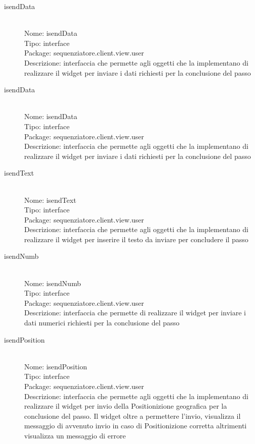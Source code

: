 \begin{description}
	\item[isendData] 
  	\hfill \\
  	Nome: isendData\\
  	Tipo: interface\\
	Package: sequenziatore.client.view.user\\
	Descrizione: interfaccia che permette agli oggetti che la implementano di realizzare il widget per inviare i dati richiesti per la conclusione del passo
\end{description}

\begin{description}
	\item[isendData] 
  	\hfill \\
  	Nome: isendData\\
  	Tipo: interface\\
	Package: sequenziatore.client.view.user\\
	Descrizione: interfaccia che permette agli oggetti che la implementano di realizzare il widget per inviare i dati richiesti per la conclusione del passo
\end{description}

\begin{description}
	\item[isendText] 
  	\hfill \\
  	Nome: isendText\\
  	Tipo: interface\\
	Package: sequenziatore.client.view.user\\
	Descrizione: interfaccia che permette agli oggetti che la implementano di realizzare il widget per inserire il testo da inviare per concludere il passo
\end{description}

\begin{description}
	\item[isendNumb] 
  	\hfill \\
  	Nome: isendNumb\\
  	Tipo: interface\\
	Package: sequenziatore.client.view.user\\
	Descrizione: interfaccia che permette di realizzare il widget per inviare i dati numerici richiesti per la conclusione del passo
\end{description}

\begin{description}
	\item[isendPosition] 
  	\hfill \\
  	Nome: isendPosition\\
  	Tipo: interface\\
	Package: sequenziatore.client.view.user\\
	Descrizione: interfaccia che permette agli oggetti che la implementano di realizzare il widget per invio della Positionizione geografica per la conclusione del passo. Il widget oltre a permettere l'invio, visualizza il messaggio di avvenuto invio in caso di Positionizione corretta altrimenti visualizza un messaggio di errore
\end{description}


